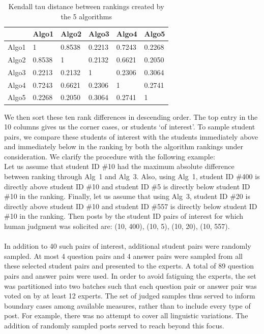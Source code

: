 \begin{table}
  \centering
  \caption{Kendall tau distance between rankings created by the 5 algorithms}
  \label{tab:kendall}
  \begin{tabular}{@{}llllll@{}}
    \toprule
    & Algo1  & Algo2  & Algo3  & Algo4  & Algo5 \\ \midrule
    Algo1 & 1 & 0.8538   & 0.2213   & 0.7243   & 0.2268        \\
    Algo2 & 0.8538   & 1 & 0.2132   & 0.6621   & 0.2050        \\
    Algo3 & 0.2213   & 0.2132   & 1 & 0.2306   & 0.3064        \\
    Algo4 & 0.7243   & 0.6621  & 0.2306   & 1 & 0.2741   \\
    Algo5 & 0.2268  & 0.2050  & 0.3064   & 0.2741 & 1 
    \\ \bottomrule
  \end{tabular}
\end{table}


We then sort these ten rank differences in descending order. The top
entry in the 10 columns gives us the corner cases, or students `of interest'. To sample
student pairs, we compare these students of interest with the
students immediately above and immediately below in the ranking by
both the algorithm rankings under consideration. We clarify the procedure
with the following example:
\\Let us assume that student ID \#10 had the maximum absolute
difference between ranking through Alg~1 and Alg~3.  Also, using
Alg~1, student ID \#400 is directly above student ID \#10 and student
ID \#5 is directly below student ID \#10 in the ranking.  Finally, let
us assume that using Alg~3, student ID \#20 is directly above student
ID \#10 and student ID \#557 is directly below student ID \#10 in the
ranking.  Then posts by the student ID pairs of interest for which
human judgment was solicited
are: (10, 400), (10, 5), (10, 20), (10, 557).
\\\\In addition to 40 such pairs of interest, additional student pairs were randomly sampled. At
most 4 question pairs and 4 answer pairs were sampled from all these
selected student pairs and presented to the experts. A total of 89
question pairs and answer pairs were used. In order to avoid fatiguing
the experts, the set was partitioned into two batches such that each
question pair or answer pair was voted on by at least 12 experts. The
set of judged samples thus served to inform boundary cases among
available measures, rather than to include every type of post. For
example, there was no attempt to cover all linguistic variations. The
addition of randomly sampled posts served to reach beyond this focus.

